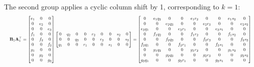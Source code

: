 \documentclass[a4paper,11pt]{article}
\begin{document}
The second group applies a cyclic column shift by 1, corresponding to $k=1$:
\[
\resizebox{\linewidth}{!}{$\displaystyle
\mathbf{B}_1 \mathbf{A}_1^\top =
\begin{bmatrix}
e_1 & 0 & 0 \\ 0 & e_2 & 0 \\ 0 & 0 & e_3 \\
f_1 & 0 & 0 \\ 0 & f_2 & 0 \\ 0 & 0 & f_3 \\
g_1 & 0 & 0 \\ 0 & g_2 & 0 \\ 0 & 0 & g_3
\end{bmatrix}
\begin{bmatrix}
0 & q_2 & 0 & 0 & r_2 & 0 & 0 & s_2 & 0 \\
0 & 0 & q_3 & 0 & 0 & r_3 & 0 & 0 & s_3 \\
q_1 & 0 & 0 & r_1 & 0 & 0 & s_1 & 0 & 0
\end{bmatrix}
=
\begin{bmatrix}
0 & e_1 q_2 & 0 & 0 & e_1 r_2 & 0 & 0 & e_1 s_2 & 0 \\
0 & 0 & e_2 q_3 & 0 & 0 & e_2 r_3 & 0 & 0 & e_2 s_3 \\
e_3 q_1 & 0 & 0 & e_3 r_1 & 0 & 0 & e_3 s_1 & 0 & 0 \\
0 & f_1 q_2 & 0 & 0 & f_1 r_2 & 0 & 0 & f_1 s_2 & 0 \\
0 & 0 & f_2 q_3 & 0 & 0 & f_2 r_3 & 0 & 0 & f_2 s_3 \\
f_3 q_1 & 0 & 0 & f_3 r_1 & 0 & 0 & f_3 s_1 & 0 & 0 \\
0 & g_1 q_2 & 0 & 0 & g_1 r_2 & 0 & 0 & g_1 s_2 & 0 \\
0 & 0 & g_2 q_3 & 0 & 0 & g_2 r_3 & 0 & 0 & g_2 s_3 \\
g_3 q_1 & 0 & 0 & g_3 r_1 & 0 & 0 & g_3 s_1 & 0 & 0
\end{bmatrix}
$}
\]
\end{document}
